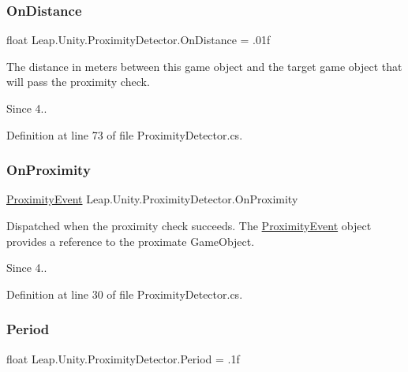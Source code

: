 \subsubsection{\texorpdfstring{OnDistance}{OnDistance}}
{\footnotesize\ttfamily float Leap.\+Unity.\+Proximity\+Detector.\+On\+Distance = .\+01f}

The distance in meters between this game object and the target game object that will pass the proximity check. \begin{DoxySince}{Since}
4.. 
\end{DoxySince}


Definition at line 73 of file Proximity\+Detector.\+cs.

\mbox{\label{class_leap_1_1_unity_1_1_proximity_detector_a6cabbb40727dcb3b5d8577982a6516cc}} 
\subsubsection{\texorpdfstring{OnProximity}{OnProximity}}
{\footnotesize\ttfamily \mbox{\hyperlink{class_leap_1_1_unity_1_1_proximity_event}{Proximity\+Event}} Leap.\+Unity.\+Proximity\+Detector.\+On\+Proximity}

Dispatched when the proximity check succeeds. The \mbox{\hyperlink{class_leap_1_1_unity_1_1_proximity_event}{Proximity\+Event}} object provides a reference to the proximate Game\+Object. \begin{DoxySince}{Since}
4.. 
\end{DoxySince}


Definition at line 30 of file Proximity\+Detector.\+cs.

\mbox{\label{class_leap_1_1_unity_1_1_proximity_detector_a630cf8c292fbdf90459f2e41ca43c890}} 
\subsubsection{\texorpdfstring{Period}{Period}}
{\footnotesize\ttfamily float Leap.\+Unity.\+Proximity\+Detector.\+Period = .\+1f}

